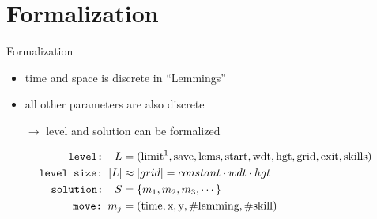 \documentclass[]{beamer}
\begin{document}
\section{Formalization}
\begin{frame}{Formalization}
\begin{itemize}
\item time and space is discrete in ``Lemmings''
\item all other parameters are also discrete
\item[$\rightarrow$] level and solution can be formalized
\end{itemize}
\begin{align*}
\texttt{level: } L &= (\text{limit\footnotemark}, \text{save}, \text{lems}, \text{start}, \text{wdt}, \text{hgt}, \text{grid}, \text{exit}, \text{skills})\\
\texttt{level size:~} |L| &\approx |grid| = constant \cdot wdt \cdot hgt\\
\texttt{solution: } S &= \{m_1, m_2, m_3, \cdots\}\\
\texttt{move:~} m_j &= (\text{time}, \text{x}, \text{y}, \text{\#lemming}, \text{\#skill})
\end{align*}
\end{frame}
\end{document}
